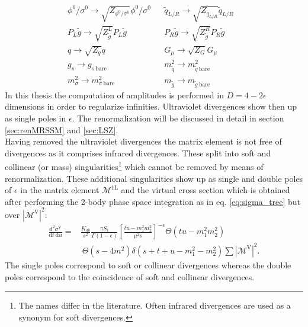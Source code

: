 \begin{align}
& \phi^0 / \sigma^0 \to \sqrt{Z_{\phi^0 / \sigma^0}}\phi^0 / \sigma^0 && \tilde{q}_{L/R} \to \sqrt{Z_{\tilde{q}_{L/R}}}\tilde{q}_{L/R}\nonumber\\
& P_L \tilde{g} \to \sqrt{Z_{\tilde{g}}^L} P_L \tilde{g} && P_R \tilde{g} \to \sqrt{Z_{\tilde{g}}^R} P_R \tilde{g}\nonumber\\
& q \to \sqrt{Z_q}q && G_\mu \to \sqrt{Z_G} G_\mu && \label{eq:fieldtrafo}\\
& g_s \to g_{s\ \mathrm{bare}} && m_{\tilde{q}}^2 \to m_{\tilde{q}\ \mathrm{bare}}^2\nonumber\\
&  m_{\sigma}^2 \to m_{\sigma\ \mathrm{bare}}^2 && m_{\tilde{g}} \to m_{\tilde{g}\ \mathrm{bare}}\label{eq:parametertrafo}
\end{align}
In this thesis the computation of amplitudes is performed in $D = 4-2\epsilon$ dimensions in order to regularize infinities. Ultraviolet divergences show then up as single poles in $\epsilon$. The renormalization will be discussed in detail in section \ref{sec:renMRSSM} and \ref{sec:LSZ}.\\
Having removed the ultraviolet divergences the matrix element is not free of divergences as it comprises infrared divergences. These split into soft and collinear (or mass) singularities\footnote{The names differ in the literature. Often infrared divergences are used as a synonym for soft divergences.} which cannot be removed by means of renormalization. These additional singularities show up as single and double poles of $\epsilon$ in the matrix element $\mathcal{M^{\mathrm{1L}}}$ and the virtual cross section which is obtained after performing the 2-body phase space  integration as in eq. \ref{eq:sigma_tree} but over $\left|\mathcal{M^{\mathrm{V}}}\right|^2$:
\begin{align}
\frac{\mbox{d}^2 \sigma^{\mathrm{V}}}{\mbox{d}t\ \mbox{d}u} =& \frac{K_{ab}}{s^2} \frac{\pi S_{\epsilon}}{\Gamma(1-\epsilon)} \left[ \frac{tu-m_1^2m_2^2}{\mu^2 s}\right]^{-\epsilon} \Theta(tu-m_1^2m_2^2)\nonumber\\
&\ \Theta(s-4m^2) \delta(s+t+u-m_1^2-m_2^2) \sum |\mathcal{M}^{\mathrm{V}}|^2.\label{eq:diffsigma}
\end{align}
The single poles correspond to soft or collinear divergences whereas the double poles correspond to the coincidence of soft and collinear divergences.


